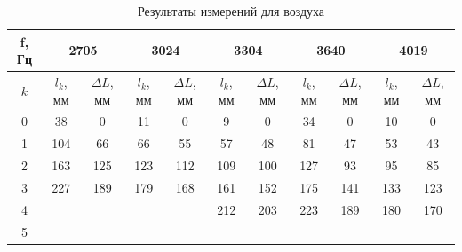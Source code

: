 \documentclass[a4paper, 12pt]{article}
\begin{document}
            \begin{table}[H]
                \centering
                
                \begin{tabular}{|c|cc|cc|cc|cc|cc|}
                    \hline
                    f, Гц & \multicolumn{2}{c|}{2705}& \multicolumn{2}{c|}{3024}& \multicolumn{2}{c|}{3304}& \multicolumn{2}{c|}{3640} & \multicolumn{2}{c|}{4019} \\ \hline
                    
                   $k$ & \multicolumn{1}{c|}{$l_k$, мм} & $\Delta L$, мм & \multicolumn{1}{c|}{$l_k$, мм} & $\Delta L$, мм & \multicolumn{1}{c|}{$l_k$, мм} & $\Delta L$, мм & \multicolumn{1}{c|}{$l_k$, мм} & $\Delta L$, мм & \multicolumn{1}{c|}{$l_k$, мм} & $\Delta L$, мм \\ \hline
                   
                    0 & \multicolumn{1}{c|}{38} & 0 & \multicolumn{1}{c|}{11}       & 0 & \multicolumn{1}{c|}{9} & 0 & \multicolumn{1}{c|}{34} & 0 & \multicolumn{1}{c|}{10} & 0 \\ \hline
                    
                    1 & \multicolumn{1}{c|}{104} & 66 & \multicolumn{1}{c|}{66} & 55 & \multicolumn{1}{c|}{57} & 48 & \multicolumn{1}{c|}{81} & 47 & \multicolumn{1}{c|}{53} & 43 \\ \hline
                    
                    2 & \multicolumn{1}{c|}{163} & 125 & \multicolumn{1}{c|}{123} & 112 & \multicolumn{1}{c|}{109} & 100 & \multicolumn{1}{c|}{127} & 93 & \multicolumn{1}{c|}{95} & 85 \\ \hline
                    
                    3 & \multicolumn{1}{c|}{227} & 189 & \multicolumn{1}{c|}{179} & 168 & \multicolumn{1}{c|}{161} & 152 & \multicolumn{1}{c|}{175} & 141 & \multicolumn{1}{c|}{133} & 123 \\ \hline
                    
                    4 & \multicolumn{1}{c|}{} & & \multicolumn{1}{c|}{} & & \multicolumn{1}{c|}{212} & 203 & \multicolumn{1}{c|}{223} & 189 & \multicolumn{1}{c|}{180} & 170 \\ \hline
                    
                    5 & \multicolumn{1}{c|}{} & & \multicolumn{1}{c|}{} & & \multicolumn{1}{c|}{} & & \multicolumn{1}{c|}{} &          & \multicolumn{1}{c|}{} & \\ \hline
                \end{tabular}
                \caption{Результаты измерений для воздуха}
                \label{tab:oxy1}
            \end{table}
\end{document}
